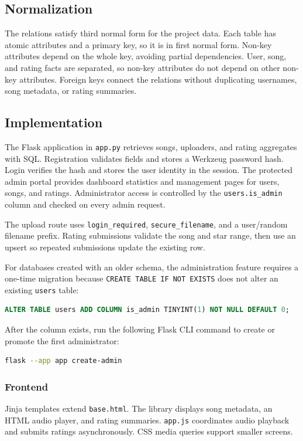 \documentclass[12pt,a4paper]{article}
\begin{document}
\subsection{Normalization}
The relations satisfy third normal form for the project data. Each table has
atomic attributes and a primary key, so it is in first normal form. Non-key
attributes depend on the whole key, avoiding partial dependencies. User,
song, and rating facts are separated, so non-key attributes do not depend on
other non-key attributes. Foreign keys connect the relations without
duplicating usernames, song metadata, or rating summaries.

\subsection{Implementation}

The Flask application in \texttt{app.py} retrieves songs, uploaders, and rating
aggregates with SQL. Registration validates fields and stores a Werkzeug
password hash. Login verifies the hash and stores the user identity in the
session. The protected admin portal provides dashboard statistics and
management pages for users, songs, and ratings. Administrator access is
controlled by the \texttt{users.is\_admin} column and checked on every admin
request.

The upload route uses \texttt{login\_required}, \texttt{secure\_filename}, and a user/random filename prefix. Rating submissions validate the song and star range, then use an upsert so repeated submissions update the existing row.

For databases created with an older schema, the administration feature
requires a one-time migration because \texttt{CREATE TABLE IF NOT EXISTS} does
not alter an existing \texttt{users} table:
\begin{lstlisting}[language=SQL]
ALTER TABLE users ADD COLUMN is_admin TINYINT(1) NOT NULL DEFAULT 0;
\end{lstlisting}
After the column exists, run the following Flask CLI command to create or
promote the first administrator:
\begin{lstlisting}[language=bash]
flask --app app create-admin
\end{lstlisting}

\subsubsection{Frontend}
Jinja templates extend \texttt{base.html}. The library displays song metadata, an HTML audio player, and rating summaries. \texttt{app.js} coordinates audio playback and submits ratings asynchronously. CSS media queries support smaller screens.
\end{document}

